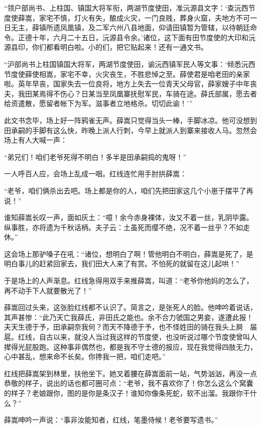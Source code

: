 “领户部尚书、上柱国、镇国大将军衔，两湖节度使田，准沅源县文字：‘查沅西节度使薛嵩，家宅不慎，灯火有失，酿成火灾，一门良贱，葬身火窟，夫地方不可一日无主，薛镇所遗凤凰镇，及二军六州八县地面，仰请田镇暂为管辖，以待朝廷命令。正德十年，六月二十五日，沅源县令余。’诸位，这下面有田节度使的大印和沅源县印，你们都看明白啦。小的们，把它贴起来！还有一通文书。 

“沪部尚书上柱国镇国大将军，两湖节度使田，谕沅西镇军民人等文事：‘倾悉沅西节度使薛使相嵩，家宅不幸，火灾丧生，不胜悲悼之至。薛使君是咱老田的亲家啦。英年早丧，国家失去一位良将，地方上失去一位青天父母官，薛家嫂子中年丧夫，我田某焉得不伤心？日某当至凤凰寨抚慰军民，车骑在途。薛氏部属，愿去者给资遣散，愿留者帐下为军。滋事者立地格杀。切切此谕！’” 

此文书念毕，场上好一阵鸦雀无声。薛嵩只觉得当头一棒，手脚冰凉。他可没想到田承嗣的手脚有这么快，昨晚上派人行刺，今早上就派人到寨来接收人马。忽然会场上有人大喊一声： 

“弟兄们！咱们老爷死得不明白！多半是田承嗣捣的鬼呀！” 

一人呼百人应，会场上乱成一咽。红线连忙用手肘拱薛嵩： 

“老爷，咱们俩杀出去吧。场上都是你的人，咱们先把田家这几个小崽于摆平了再说！” 

谁知薛嵩长叹一声，面如灰土：“噫！余今赤身裸体，汝又不着一丝，乳阴毕露。纵事胜，亦将遗为千秋话柄。夫子云：土虽死而缨不绝，况不着一丝乎？不如走休。” 

这会场上那驴嗓子在吼：“诸位，想明白了啊！管他明白不明白，薛嵩是死了，是明白事儿的赶紧回家去，我们田大人来了有赏。不怕死的就留在这儿起哄！” 

于是场上的人声渐息。红线急得用双手来推薛嵩，叫道：“老爷你他妈的怎么了，再不动手下人就要散光了！” 

薛嵩回过头来，这张脸红线都不认识了。简言之，是张死人的脸。他呻吟着说话，其声甚惨：“此乃天亡我薛氏，非田氏之能也。余不合力虢国之男妾，遂遭此报！夫天生德于予，田承嗣奈我何？而天不降德于予，也不怪姓田的骑在我头上屙　届扈。红线，自古以来，就没人当过我这样的节度使，也没听说过哪个节度使曾叫人撵得光屁股跑。这种事非偶然也，都是我不守士德的报应，现在我觉得四肢无力，心中甚乱，想来命不长矣。你搀我一把，咱们走吧。” 

红线把薛嵩架到林里，扶他坐下。她叉着腰在薛嵩面前一站，气势汹汹，再没一点恭敬的样子，说出的话也都可圈可点：“老爷，我不喜欢你了！你怎么这么个窝囊的样子？老娘跟你，图的是你是条汉子！谁知你像条死蛇，软不出溜。我跟你干什么？” 

薛嵩呻吟一声说：“事非汝能知者，红线，笔墨侍候！老爷要写遗书。” 

